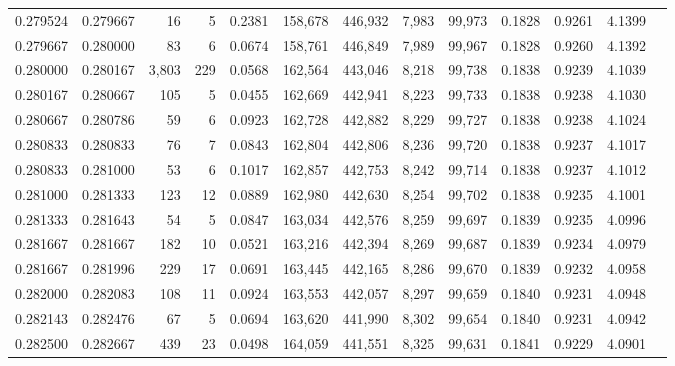 \begin{tabular}{rrrrrrrrrrrrr}
0.279524 & 0.279667 &    16 &   5 &                                     0.2381 & 158,678 & 446,932 &   7,983 &  99,973 & 0.1828 & 0.9261 & 4.1399 \\
0.279667 & 0.280000 &    83 &   6 &                                     0.0674 & 158,761 & 446,849 &   7,989 &  99,967 & 0.1828 & 0.9260 & 4.1392 \\
0.280000 & 0.280167 & 3,803 & 229 &                                     0.0568 & 162,564 & 443,046 &   8,218 &  99,738 & 0.1838 & 0.9239 & 4.1039 \\
0.280167 & 0.280667 &   105 &   5 &                                     0.0455 & 162,669 & 442,941 &   8,223 &  99,733 & 0.1838 & 0.9238 & 4.1030 \\
0.280667 & 0.280786 &    59 &   6 &                                     0.0923 & 162,728 & 442,882 &   8,229 &  99,727 & 0.1838 & 0.9238 & 4.1024 \\
0.280833 & 0.280833 &    76 &   7 &                                     0.0843 & 162,804 & 442,806 &   8,236 &  99,720 & 0.1838 & 0.9237 & 4.1017 \\
0.280833 & 0.281000 &    53 &   6 &                                     0.1017 & 162,857 & 442,753 &   8,242 &  99,714 & 0.1838 & 0.9237 & 4.1012 \\
0.281000 & 0.281333 &   123 &  12 &                                     0.0889 & 162,980 & 442,630 &   8,254 &  99,702 & 0.1838 & 0.9235 & 4.1001 \\
0.281333 & 0.281643 &    54 &   5 &                                     0.0847 & 163,034 & 442,576 &   8,259 &  99,697 & 0.1839 & 0.9235 & 4.0996 \\
0.281667 & 0.281667 &   182 &  10 &                                     0.0521 & 163,216 & 442,394 &   8,269 &  99,687 & 0.1839 & 0.9234 & 4.0979 \\
0.281667 & 0.281996 &   229 &  17 &                                     0.0691 & 163,445 & 442,165 &   8,286 &  99,670 & 0.1839 & 0.9232 & 4.0958 \\
0.282000 & 0.282083 &   108 &  11 &                                     0.0924 & 163,553 & 442,057 &   8,297 &  99,659 & 0.1840 & 0.9231 & 4.0948 \\
0.282143 & 0.282476 &    67 &   5 &                                     0.0694 & 163,620 & 441,990 &   8,302 &  99,654 & 0.1840 & 0.9231 & 4.0942 \\
0.282500 & 0.282667 &   439 &  23 &                                     0.0498 & 164,059 & 441,551 &   8,325 &  99,631 & 0.1841 & 0.9229 & 4.0901 \\

\end{tabular}
